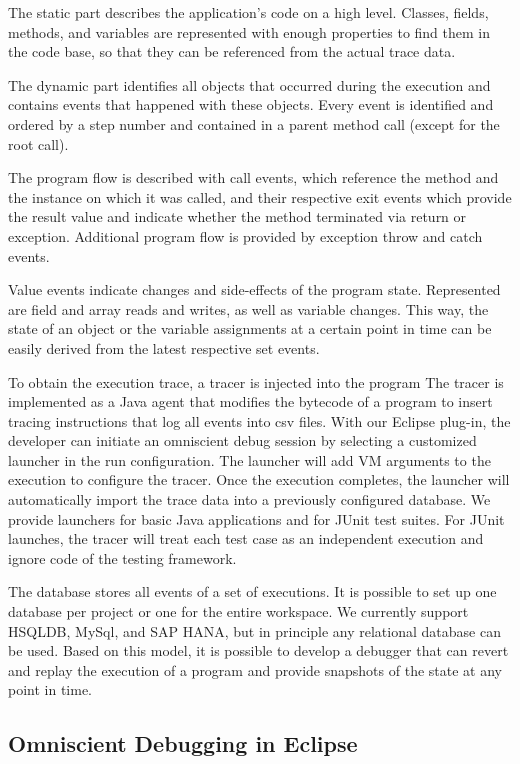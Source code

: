 The static part describes the application's code on a high level.
Classes, fields, methods, and variables are represented with enough properties to find them in the code base, so that they can be referenced from the actual trace data.

The dynamic part identifies all objects that occurred during the execution and contains events that happened with these objects.
Every event is identified and ordered by a step number and contained in a parent method call (except for the root call).

The program flow is described with call events, which reference the method and the instance on which it was called, and their respective exit events which provide the result value and indicate whether the method terminated via return or exception.
Additional program flow is provided by exception throw and catch events.

Value events indicate changes and side-effects of the program state.
Represented are field and array reads and writes, as well as variable changes.
This way, the state of an object or the variable assignments at a certain point in time can be easily derived from the latest respective set events.

To obtain the execution trace, a tracer is injected into the program
The tracer is implemented as a Java agent that modifies the bytecode of a program to insert tracing instructions that log all events into csv files.
With our Eclipse plug-in, the developer can initiate an omniscient debug session by selecting a customized launcher in the run configuration.
The launcher will add VM arguments to the execution to configure the tracer.
Once the execution completes, the launcher will automatically import the trace data into a previously configured database.
We provide launchers for basic Java applications and for JUnit test suites.
For JUnit launches, the tracer will treat each test case as an independent execution and ignore code of the testing framework.

The database stores all events of a set of executions.
It is possible to set up one database per project or one for the entire workspace.
We currently support HSQLDB, MySql, and SAP HANA, but in principle any relational database can be used.
Based on this model, it is possible to develop a debugger that can revert and replay the execution of a program and provide snapshots of the state at any point in time.

\subsection{Omniscient Debugging in Eclipse}

